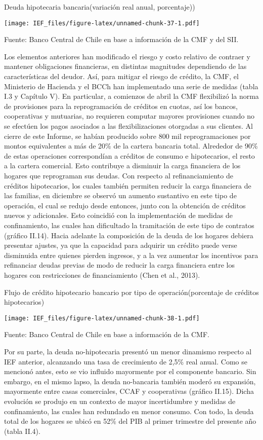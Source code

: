 \documentclass[
]{book}
\begin{document}
Deuda hipotecaria bancaria(variación real anual, porcentaje))

\texttt{[image: IEF\_files/figure-latex/unnamed-chunk-37-1.pdf]}

Fuente: Banco Central de Chile en base a información de la CMF y del SII.

Los elementos anteriores han modificado el riesgo y costo relativo de contraer
y mantener obligaciones financieras, en distintas magnitudes dependiendo de
las características del deudor. Así, para mitigar el riesgo de crédito, la CMF, el
Ministerio de Hacienda y el BCCh han implementado una serie de medidas
(tabla I.3 y Capítulo V). En particular, a comienzos de abril la CMF flexibilizó
la norma de provisiones para la reprogramación de créditos en cuotas, así los
bancos, cooperativas y mutuarias, no requieren computar mayores provisiones
cuando no se efectúen los pagos asociados a las flexibilizaciones otorgadas
a sus clientes. Al cierre de este Informe, se habían producido sobre 800 mil
reprogramaciones por montos equivalentes a más de 20\% de la cartera
bancaria total. Alrededor de 90\% de estas operaciones correspondían a créditos
de consumo e hipotecarios, el resto a la cartera comercial. Esto contribuye a
disminuir la carga financiera de los hogares que reprograman sus deudas.
Con respecto al refinanciamiento de créditos hipotecarios, los cuales también
permiten reducir la carga financiera de las familias, en diciembre se observó
un aumento sustantivo en este tipo de operación, el cual se redujo desde
entonces, junto con la obtención de créditos nuevos y adicionales. Esto
coincidió con la implementación de medidas de confinamiento, las cuales
han dificultado la tramitación de este tipo de contratos (gráfico II.14). Hacia
adelante la composición de la deuda de los hogares debiera presentar ajustes,
ya que la capacidad para adquirir un crédito puede verse disminuida entre
quienes pierden ingresos, y a la vez aumentar los incentivos para refinanciar
deudas previas de modo de reducir la carga financiera entre los hogares con
restricciones de financiamiento (Chen et al., 2013).

Flujo de crédito hipotecario bancario por tipo de operación(porcentaje de créditos hipotecarios)

\texttt{[image: IEF\_files/figure-latex/unnamed-chunk-38-1.pdf]}

Fuente: Banco Central de Chile en base a información de la CMF.

Por su parte, la deuda no-hipotecaria presentó un menor dinamismo respecto al
IEF anterior, alcanzando una tasa de crecimiento de 2,5\% real anual. Como se
mencionó antes, esto se vio influido mayormente por el componente bancario.
Sin embargo, en el mismo lapso, la deuda no-bancaria también moderó su
expansión, mayormente entre casas comerciales, CCAF y cooperativas (gráfico
II.15). Dicha evolución se produjo en un contexto de mayor incertidumbre y
medidas de confinamiento, las cuales han redundado en menor consumo. Con
todo, la deuda total de los hogares se ubicó en 52\% del PIB al primer trimestre
del presente año (tabla II.4).
\end{document}
